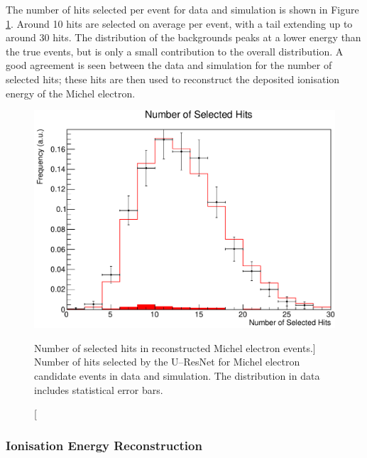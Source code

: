The number of hits selected per event for data and simulation is shown in
Figure \ref{fig:mich_n_hits}. Around 10 hits are selected on average per 
event, with a tail extending up to around 30 hits. The distribution of the 
backgrounds peaks at a lower energy than the true events, but is only a small
contribution to the overall distribution. A good agreement is seen between the 
data and simulation for the number of selected hits; these hits are then used 
to reconstruct the deposited ionisation energy of the Michel electron.
\begin{figure}
	\centering
	\includegraphics[width=\textwidth]{figures/mich_n_hits.pdf}
	\caption
	[Number of selected hits in reconstructed Michel electron events.]
	{Number of hits selected by the U--ResNet for Michel electron candidate
	events in data and simulation. The distribution in data includes statistical
	error bars.}
	\label{fig:mich_n_hits}
\end{figure}

\subsubsection{Ionisation Energy Reconstruction}


